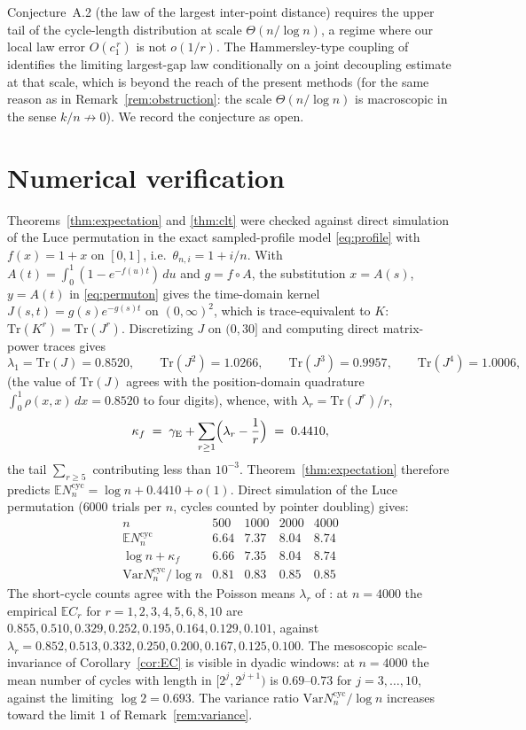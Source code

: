 \documentclass[11pt]{article}
\newcommand{\E}{\mathbb{E}}
\newcommand{\1}{\mathbf{1}}
\newcommand{\Var}{\mathrm{Var}}
\newcommand{\Tr}{\mathrm{Tr}}
\newcommand{\cyc}{\mathrm{cyc}}
\newcommand{\gE}{\gamma_{\mathrm{E}}}
\theoremstyle{remark}
\begin{document}
Conjecture~A.2 (the law of the largest inter-point distance) requires
the upper tail of the cycle-length distribution at scale
$\Theta(n/\log n)$, a regime where our local law error $O(c_1^{\,r})$
is not $o(1/r)$. The Hammersley-type coupling of \cite[Section~11]{Lon26}
identifies the limiting largest-gap law conditionally on a joint
decoupling estimate at that scale, which is beyond the reach of the
present methods (for the same reason as in
Remark~\ref{rem:obstruction}: the scale $\Theta(n/\log n)$ is
macroscopic in the sense $k/n\not\to0$). We record the conjecture as
open.

\appendix

\section{Numerical verification}\label{app:numerics}

Theorems~\ref{thm:expectation} and \ref{thm:clt} were checked against
direct simulation of the Luce permutation in the exact sampled-profile
model \eqref{eq:profile} with $f(x)=1+x$ on $[0,1]$, i.e.\
$\theta_{n,i}=1+i/n$. With $A(t)=\int_0^1(1-e^{-f(u)t})\,du$ and
$g=f\circ A$, the substitution $x=A(s)$, $y=A(t)$ in
\eqref{eq:permuton} gives the time-domain kernel
$J(s,t)=g(s)e^{-g(s)t}$ on $(0,\infty)^2$, which is trace-equivalent to
$K$: $\Tr(K^r)=\Tr(J^r)$. Discretizing $J$ on $(0,30]$ and computing
direct matrix-power traces gives
\[
\lambda_1=\Tr(J)=0.8520,\qquad
\Tr(J^2)=1.0266,\qquad
\Tr(J^3)=0.9957,\qquad
\Tr(J^4)=1.0006,
\]
(the value of $\Tr(J)$ agrees with the position-domain quadrature
$\int_0^1\rho(x,x)\,dx=0.8520$ to four digits), whence, with
$\lambda_r=\Tr(J^r)/r$,
\[
\kappa_f\;=\;\gE+\sum_{r\ge1}\Bigl(\lambda_r-\frac1r\Bigr)
\;=\;0.4410,
\]
the tail $\sum_{r\ge5}$ contributing less than $10^{-3}$.
Theorem~\ref{thm:expectation} therefore predicts
$\E N_n^{\cyc}=\log n+0.4410+o(1)$. Direct simulation of the Luce
permutation ($6000$ trials per $n$, cycles counted by pointer doubling)
gives:
\[
\begin{array}{c|cccc}
n & 500 & 1000 & 2000 & 4000\\\hline
\E N_n^{\cyc} & 6.64 & 7.37 & 8.04 & 8.74\\
\log n+\kappa_f & 6.66 & 7.35 & 8.04 & 8.74\\
\Var N_n^{\cyc}/\log n & 0.81 & 0.83 & 0.85 & 0.85
\end{array}
\]
The short-cycle counts agree with the Poisson means $\lambda_r$ of
\cite[Theorem~5.1]{Lon26}: at $n=4000$ the empirical $\E C_r$ for
$r=1,2,3,4,5,6,8,10$ are $0.855,0.510,0.329,0.252,0.195,0.164,0.129,
0.101$, against $\lambda_r=0.852,0.513,0.332,0.250,0.200,0.167,0.125,
0.100$. The mesoscopic scale-invariance of Corollary~\ref{cor:EC} is
visible in dyadic windows: at $n=4000$ the mean number of cycles with
length in $[2^j,2^{j+1})$ is $0.69$--$0.73$ for $j=3,\dots,10$, against
the limiting $\log 2=0.693$. The variance ratio
$\Var N_n^{\cyc}/\log n$ increases toward the limit $1$ of
Remark~\ref{rem:variance}.
\end{document}
